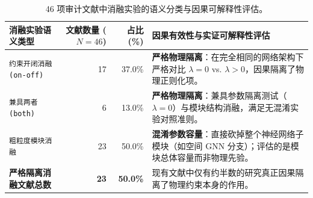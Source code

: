 \begin{table}[!t]
\centering
\footnotesize
\renewcommand{\arraystretch}{0.92}
\setlength{\tabcolsep}{3.5pt}
\caption{46 项审计文献中消融实验的语义分类与因果可解释性评估。}
\label{tab:ablation_semantics}
\begin{tabularx}{\textwidth}{p{4.2cm}rrX}
\toprule
\textbf{消融实验语义类型} & \textbf{文献数量 ($N=46$)} & \textbf{占比 (\%)} & \textbf{因果有效性与实证可解释性评估} \\
\midrule
\texttt{约束开闭消融 (on-off)} & 17 & 37.0\% & \textbf{严格物理隔离}：在完全相同的网络架构下严格对比 $\lambda=0$ vs. $\lambda > 0$，因果隔离了物理正则化项。 \\
\texttt{兼具两者 (both)} & 6 & 13.0\% & \textbf{严格物理隔离}：兼具参数隔离测试（$\lambda=0$）与模块结构消融，满足无混淆实验对照准则。 \\
\texttt{粗粒度模块消融} & 23 & 50.0\% & \textbf{混淆参数容量}：直接砍掉整个神经网络子模块（如空间 GNN 分支）；评估的是模块总体容量而非物理先验。 \\
\midrule
\textbf{严格隔离消融文献总数} & \textbf{23} & \textbf{50.0\%} & 现有文献中仅有约半数的研究真正因果隔离了物理约束本身的作用。 \\
\bottomrule
\end{tabularx}
\end{table}
